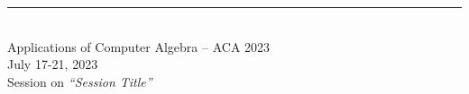 \documentclass{article}
\newcommand{\HEADING}{
{\noindent \small Applications of Computer Algebra -- ACA 2023 \\
\small July 17-21, 2023\\
Session on \textit{``Session Title''}}
\vspace{10pt}}
\begin{document}
	
\rule{\textwidth}{0.01 in}\\[-2em]
	
\HEADING	

\vspace{1cm}




\end{document}
